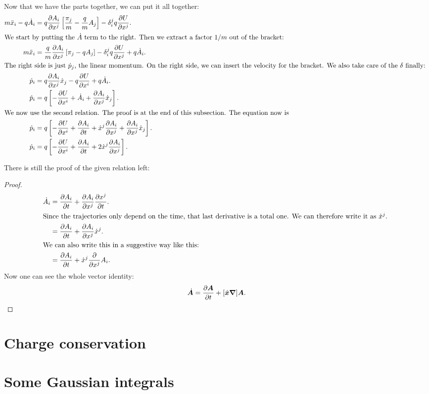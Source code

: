 \documentclass[11pt, english, fleqn, DIV=15, headinclude, BCOR=1cm]{scrartcl}
\begin{document}
Now that we have the parts together, we can put it all together:
\begin{align*}
    m \ddot x_i - q \dot A_i &= 
    q \pd{A_i}{x^j}
    \sbr{\frac{\pi_j}m - \frac qm A_j}
    -
    \delta_i^j
    q \pd{U}{x^j}. \\
    \intertext{%
        We start by putting the $\dot A$ term to the right. Then we extract a
        factor $1/m$ out of the bracket:
    }
    m \ddot x_i &= \frac qm \pd{A_i}{x^j} \sbr{\pi_j - q
    A_j} - \delta_i^j q \pd{U}{x^j} + q \dot A_i. \\
    \intertext{%
        The right side is just $\dot p_j$, the linear momentum. On the right
        side, we can insert the velocity for the bracket. We also take care of
        the $\delta$ finally:
    }
    \dot p_i &= q \pd{A_i}{x^j} \dot x_j - q \pd{U}{x^i} + q \dot A_i. \\
    \dot p_i &= q \sbr{- \pd{U}{x^i} + \dot A_i + \pd{A_i}{x^j} \dot x_j}. \\
    \intertext{%
        We now use the second relation. The proof is at the end of this
        subsection. The equation now is
    }
    \dot p_i &= q \sbr{- \pd{U}{x^i} + \pd{A_i}t + \dot x^j \pd{A_i}{x^j} + \pd{A_i}{x^j} \dot x_j}. \\
    \dot p_i &= q \sbr{- \pd{U}{x^i} + \pd{A_i}t + 2 \dot x^j \pd{A_i}{x^j}}. \\
\end{align*}

\fehlt

There is still the proof of the given relation left:

\begin{proof}
    \begin{align*}
        \dot A_i
        &= \pd{A_i}t + \pd{A_i}{x^j} \pd{x^j}{t}. \\
        \intertext{%
            Since the trajectories only depend on the time, that last
            derivative is a total one. We can therefore write it as $\dot x^j$.
        }
        &= \pd{A_i}t + \pd{A_i}{x^j} \dot x^j. \\
        \intertext{%
            We can also write this in a suggestive way like this:
        }
        &= \pd{A_i}t + \dot x^j \pd{}{x^j} A_i.
    \end{align*}
    Now one can see the whole vector identity:
    \[
        \dot{\boldsymbol{A}} = \frac{\partial {\boldsymbol{A}}}{\partial {t}} + [\dot{\boldsymbol{x}} \boldsymbol{\nabla}] \boldsymbol{A}.
    \]
\end{proof}

\section{Charge conservation} %

\section{Some Gaussian integrals} %
\end{document}
